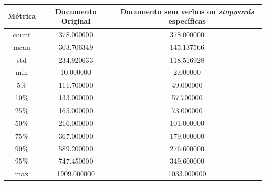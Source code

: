 \begin{center}
    \begin{tabular}{ |c|c|c| }
        \hline
        \textbf{Métrica} & \textbf{Documento Original} & \textbf{Documento sem verbos ou \textit{stopwords} específicas} \\
        \hline
        count & 378.000000 & 378.000000 \\
        \hline
        mean & 303.706349 & 145.137566 \\
        \hline
        std & 234.920633 & 118.516928 \\
        \hline
        min & 10.000000 & 2.000000 \\
        \hline
        5\% & 111.700000 & 49.000000 \\
        \hline
        10\% & 133.000000 & 57.700000 \\
        \hline
        25\% & 165.000000 & 73.000000 \\
        \hline
        50\% & 216.000000 & 101.000000 \\
        \hline
        75\% & 367.000000 & 179.000000 \\
        \hline
        90\% & 589.200000 & 276.600000 \\
        \hline
        95\% & 747.450000 & 349.600000 \\
        \hline
        max & 1909.000000 & 1033.000000 \\       
        \hline
    \end{tabular}
\end{center}